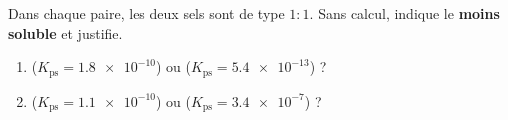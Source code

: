 \documentclass[11pt,a4paper]{article}
\begin{document}
\begin{exo}
Dans chaque paire, les deux sels sont de type $1{:}1$. Sans calcul, indique le \textbf{moins soluble}
et justifie.
\begin{enumerate}[label=\alph*)]
  \item {} ($K_{\mathrm{ps}}=\num{1.8e-10}$) ou  ($K_{\mathrm{ps}}=\num{5.4e-13}$) ?
  \item {} ($K_{\mathrm{ps}}=\num{1.1e-10}$) ou  ($K_{\mathrm{ps}}=\num{3.4e-7}$) ?
\end{enumerate}
\end{exo}
\end{document}
